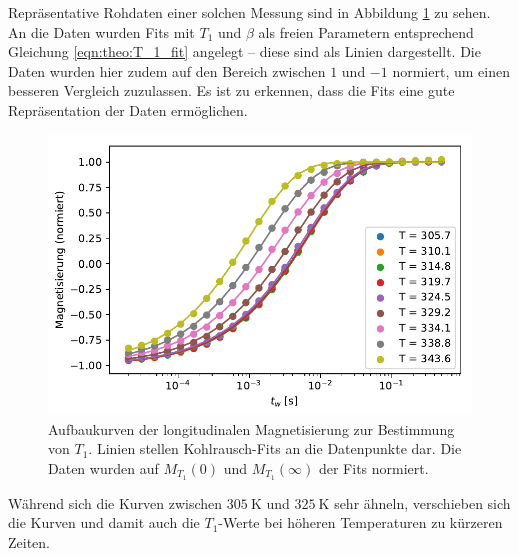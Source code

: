 Repräsentative Rohdaten einer solchen Messung sind in Abbildung \ref{fig:res:T_1_roh} zu sehen. An die Daten wurden Fits mit $T_1$ und $\beta$ als freien Parametern entsprechend Gleichung \eqref{eqn:theo:T_1_fit} angelegt -- diese sind als Linien dargestellt. Die Daten wurden hier zudem auf den Bereich zwischen $1$ und $-1$ normiert, um einen besseren Vergleich zuzulassen. Es ist zu erkennen, dass die Fits eine gute Repräsentation der Daten ermöglichen.
\begin{figure}
	\begin{center}
		\includegraphics[width=.9\textwidth]{graphics/plot/t1_roh2.pdf}
	\end{center}
	\caption{Aufbaukurven der longitudinalen Magnetisierung zur Bestimmung von $T_1$. Linien stellen Kohlrausch-Fits an die Datenpunkte dar. Die Daten wurden auf $M_{T_1}(0)$ und $M_{T_1}(\infty)$ der Fits normiert.} \label{fig:res:T_1_roh}
\end{figure}

Während sich die Kurven zwischen $\SI{305}{\kelvin}$ und $\SI{325}{\kelvin}$ sehr ähneln, verschieben sich die Kurven und damit auch die $T_1$-Werte bei höheren Temperaturen zu kürzeren Zeiten.

